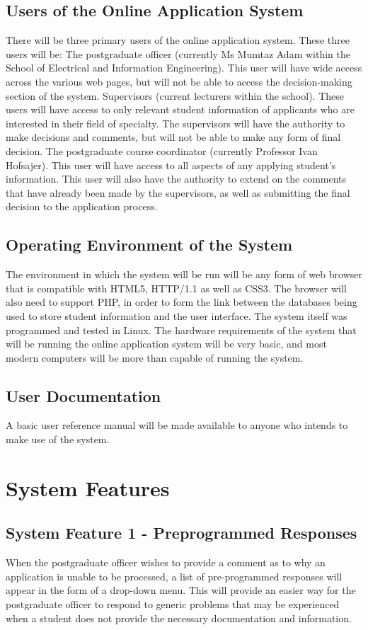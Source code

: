 \documentclass[journal,comsoc,onecolumn]{IEEEtran}
\begin{document}
\subsection{ Users of the Online Application System}
There will be three primary users of the online application system. These three users will be:
The postgraduate officer (currently Ms Mumtaz Adam within the School of Electrical and Information Engineering). This user will have wide access across the various web pages, but will not be able to access the decision-making section of the system.
Supervisors (current lecturers within the school). These users will have access to only relevant student information of applicants who are interested in their field of specialty. The supervisors will have the authority to make decisions and comments, but will not be able to make any form of final decision.
The postgraduate course coordinator (currently Professor Ivan Hofsajer). This user will have access to all aspects of any applying student’s information. This user will also have the authority to extend on the comments that have already been made by the supervisors, as well as submitting the final decision to the application process.

\subsection{Operating Environment of the System}
The environment in which the system will be run will be any form of web browser that is compatible with HTML5, HTTP/1.1 as well as CSS3. The browser will also need to support PHP, in order to form the link between the databases being used to store student information and the user interface.
The system itself was programmed and tested in Linux. The hardware requirements of the system that will be running the online application system will be very basic, and most modern computers will be more than capable of running the system.

\subsection{User Documentation}
A basic user reference manual will be made available to anyone who intends to make use of the system.

\section{System Features}

\subsection{System Feature 1 - Preprogrammed Responses}
When the postgraduate officer wishes to provide a comment as to why an application is unable to be processed, a list of pre-programmed responses will appear in the form of a drop-down menu. This will provide an easier way for the postgraduate officer to respond to generic problems that may be experienced when a student does not provide the necessary documentation and information.
\end{document}
